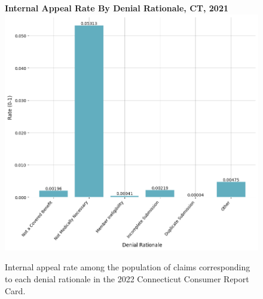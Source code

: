 \documentclass[12pt, a4paper,twoside]{report}
\theoremstyle{plain} %
\theoremstyle{definition} %
\theoremstyle{remark} %
\numberwithin{equation}{chapter}
\begin{document}
		
			\begin{figure}[h!]
				\centering
				\textbf{Internal Appeal Rate By Denial Rationale, CT, 2021}
				\includegraphics[width=\columnwidth]{images/ct_claims/internal_appeals_by_rationale.png}
				\caption{ Internal appeal rate among the population of claims corresponding to each denial rationale in the 2022 Connecticut Consumer Report Card.}
				\label{ctinternalappealratebydenialrationale}
			\end{figure}

	
	
\end{document}

